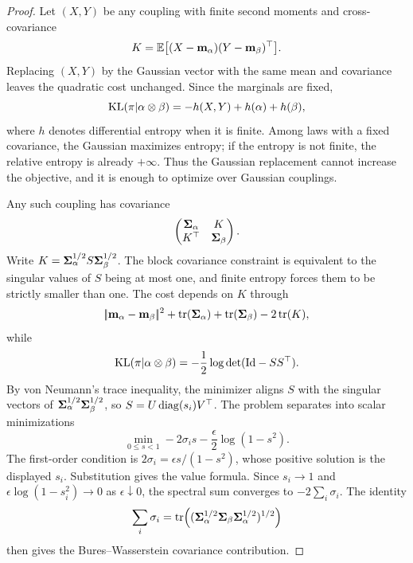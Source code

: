 \begin{proof}
	Let $(X,Y)$ be any coupling with finite second moments and cross-covariance
	\[
		K=\mathbb{E}\big[(X-\mathbf{m}_\alpha)(Y-\mathbf{m}_\beta)^\top\big].
	\]
	Replacing $(X,Y)$ by the Gaussian vector with the same mean and covariance leaves the quadratic cost unchanged. Since the marginals are fixed,
	\[
		\operatorname{KL}(\pi|\alpha\otimes\beta)
		=
		-h(X,Y)+h(\alpha)+h(\beta),
	\]
	where $h$ denotes differential entropy when it is finite. Among laws with a fixed covariance, the Gaussian maximizes entropy; if the entropy is not finite, the relative entropy is already $+\infty$. Thus the Gaussian replacement cannot increase the objective, and it is enough to optimize over Gaussian couplings.

	Any such coupling has covariance
	\[
		\begin{pmatrix}
			\mathbf{\Sigma}_\alpha & K\\
			K^\top & \mathbf{\Sigma}_\beta
		\end{pmatrix}.
	\]
	Write $K=\mathbf{\Sigma}_\alpha^{1/2}S\mathbf{\Sigma}_\beta^{1/2}$. The block covariance constraint is equivalent to the singular values of $S$ being at most one, and finite entropy forces them to be strictly smaller than one. The cost depends on $K$ through
	\[
		|\!| \mathbf{m}_\alpha-\mathbf{m}_\beta |\!|^2+\operatorname{tr}(\mathbf{\Sigma}_\alpha)+\operatorname{tr}(\mathbf{\Sigma}_\beta)-2\operatorname{tr}(K),
	\]
	while
	\[
		\operatorname{KL}(\pi|\alpha\otimes\beta)
		=
		-\frac12\log\det(\mathrm{Id}-SS^\top).
	\]
	By von Neumann's trace inequality, the minimizer aligns $S$ with the singular vectors of $\mathbf{\Sigma}_\alpha^{1/2}\mathbf{\Sigma}_\beta^{1/2}$, so $S=U\operatorname{diag}(s_i)V^\top$. The problem separates into scalar minimizations
	\[
		\min_{0\leq s<1}
		-2\sigma_i s-\frac{\epsilon}{2}\log(1-s^2).
	\]
	The first-order condition is $2\sigma_i=\epsilon s/(1-s^2)$, whose positive solution is the displayed $s_i$. Substitution gives the value formula. Since $s_i\to1$ and $\epsilon\log(1-s_i^2)\to0$ as $\epsilon\downarrow0$, the spectral sum converges to $-2\sum_i\sigma_i$. The identity
	\[
		\sum_i\sigma_i
		=
		\operatorname{tr}\!\left((\mathbf{\Sigma}_\alpha^{1/2}\mathbf{\Sigma}_\beta\mathbf{\Sigma}_\alpha^{1/2})^{1/2}\right)
	\]
	then gives the Bures--Wasserstein covariance contribution.
\end{proof}

